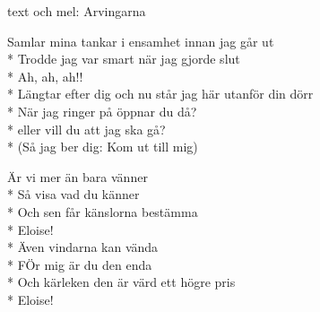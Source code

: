 \begin{SongText}[Eloise]
    \begin{SongInfo}
        text och mel: Arvingarna
    \end{SongInfo}
    \begin{SongVerse}
        Samlar mina tankar i ensamhet innan jag går ut\\*%
        Trodde jag var smart när jag gjorde slut\\*%
        Ah, ah, ah!!\\*%
        Längtar efter dig och nu står jag här utanför din dörr\\*%
        När jag ringer på öppnar du då?\\*%
        eller vill du att jag ska gå?\\*%
        (Så jag ber dig: Kom ut till mig)
    \end{SongVerse}
    \begin{SongVerse}
        Är vi mer än bara vänner\\*%
        Så visa vad du känner\\*%
        Och sen får känslorna bestämma\\*%
        Eloise!\\*%
        Även vindarna kan vända\\*%
        FÖr mig är du den enda\\*%
        Och kärleken den är värd ett högre pris\\*%
        Eloise!
    \end{SongVerse}
\end{SongText}

\newpage